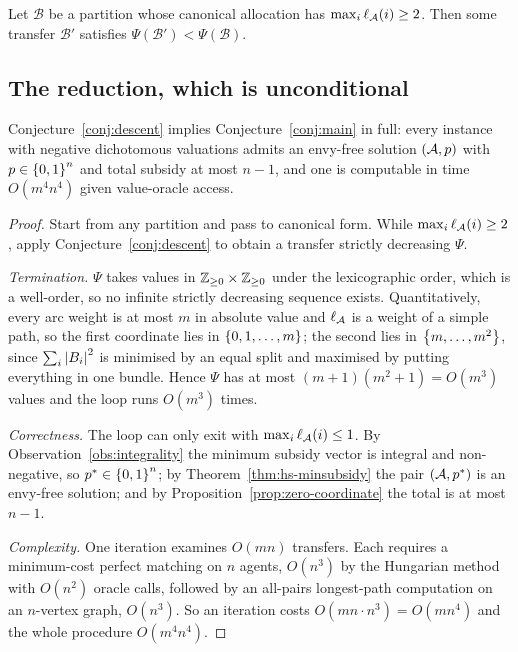 \begin{conjecture}
\label{conj:descent}
Let $\mathcal B$ be a partition whose canonical allocation has
$\max_i \ell_{\mathcal{A}}(i) \ge 2$. Then some transfer $\mathcal B'$ satisfies
$\Psi(\mathcal B') < \Psi(\mathcal B)$.
\end{conjecture}

\subsection{The reduction, which is unconditional}

\begin{theorem}
\label{thm:descent-suffices}
Conjecture~\ref{conj:descent} implies Conjecture~\ref{conj:main} in full: every
instance with negative dichotomous valuations admits an envy-free solution
$(\mathcal{A}, p)$ with $p \in \left\{0,1\right\}^n$ and total subsidy at most
$n-1$, and one is computable in time $O(m^4 n^4)$ given value-oracle access.
\end{theorem}

\begin{proof}
Start from any partition and pass to canonical form. While
$\max_i \ell_{\mathcal{A}}(i) \ge 2$, apply Conjecture~\ref{conj:descent} to obtain a
transfer strictly decreasing $\Psi$.

\emph{Termination.} $\Psi$ takes values in $\mathbb{Z}_{\ge 0} \times \mathbb{Z}_{\ge 0}$ under
the lexicographic order, which is a well-order, so no infinite strictly
decreasing sequence exists. Quantitatively, every arc weight is at most $m$ in
absolute value and $\ell_{\mathcal{A}}$ is a weight of a simple path, so the first
coordinate lies in $\left\{0,1,\dots,m\right\}$; the second lies in $\left\{m, \dots, m^2\right\}$,
since $\sum_i \left\lvert B_i\right\rvert^2$ is minimised by an equal split and maximised by
putting everything in one bundle. Hence $\Psi$ has at most $(m+1)(m^2+1) =
O(m^3)$ values and the loop runs $O(m^3)$ times.

\emph{Correctness.} The loop can only exit with $\max_i \ell_{\mathcal{A}}(i) \le 1$.
By Observation~\ref{obs:integrality} the minimum subsidy vector is integral and
non-negative, so $p^{*} \in \left\{0,1\right\}^n$; by
Theorem~\ref{thm:hs-minsubsidy} the pair $(\mathcal{A}, p^{*})$ is an envy-free
solution; and by Proposition~\ref{prop:zero-coordinate} the total is at most
$n-1$.

\emph{Complexity.} One iteration examines $O(mn)$ transfers. Each requires a
minimum-cost perfect matching on $n$ agents, $O(n^3)$ by the Hungarian method
with $O(n^2)$ oracle calls, followed by an all-pairs longest-path computation on
an $n$-vertex graph, $O(n^3)$. So an iteration costs $O(mn \cdot n^3) = O(mn^4)$
and the whole procedure $O(m^4 n^4)$.
\end{proof}

